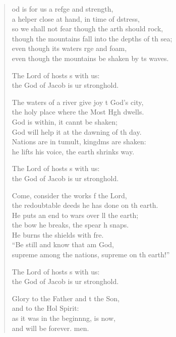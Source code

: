 \settowidth{\versewidth}{though the mountains fall into the depths of the sea;}
\begin{verse}%
  \begin{patverse}
od is for us a refge and strength,\Med\\
a helper close at hand, in time of dstress,\\
so we shall not fear though the arth should rock,\Med\\
though the mountains fall into the depths of th sea;\\
even though its waters rge and foam,\Med\\
even though the mountains be shaken by ts waves.

The Lord of hosts s with us:\Med\\
the God of Jacob is ur stronghold.

The waters of a river give joy t God’s city,\Med\\
the holy place where the Most Hgh dwells.\\
God is within, it cannt be shaken;\Med\\
God will help it at the dawning of th day.\\
Nations are in tumult, kingdms are shaken:\Med\\
he lifts his voice, the earth shrinks way.

The Lord of hosts s with us:\Med\\
the God of Jacob is ur stronghold.

Come, consider the works f the Lord,\Med\\
the redoubtable deeds he has done on th earth.\\
He puts an end to wars over ll the earth;\Med\\
the bow he breaks, the spear h snaps.\\
He burns the shields with fre.\Flex\\
“Be still and know that  am God,\Med\\
supreme among the nations, supreme on th earth!”

The Lord of hosts s with us:\Med\\
the God of Jacob is ur stronghold.

Glory to the Father and t the Son,\Med\\
and to the Hol Spirit:\\
as it was in the beginnng, is now,\Med\\
and will be forever. men. 
  \end{patverse}
\end{verse}
